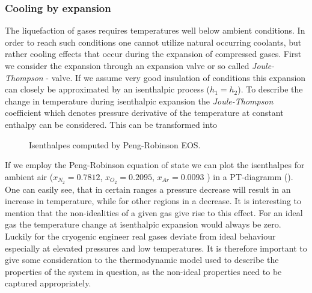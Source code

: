     \subsubsection{Cooling by expansion}
        The liquefaction of gases requires temperatures well below ambient conditions. In order to reach
        such conditions one cannot utilize natural occurring coolants, but rather cooling effects that occur
        during the expansion of compressed gases. First we consider the expansion through an expansion valve
        or so called \emph{Joule-Thompson} - valve. If we assume very good insulation of  conditions this
        expansion can closely be approximated by an isenthalpic process ($h_1 = h_2$). To describe the change
        in temperature during isenthalpic expansion the \emph{Joule-Thompson} coefficient
        which denotes pressure derivative of the temperature at constant enthalpy can be considered.
        This can be transformed into


        \begin{figure}
            \center
            
            \caption{Isenthalpes computed by Peng-Robinson EOS.}
            \label{fig:pr_isenthalpes}
        \end{figure}

        If we employ the Peng-Robinson equation of state we can plot the isenthalpes for ambient air
        ($x_{N_2}=0.7812$, $x_{O_2}=0.2095$, $x_{Ar}=0.0093$ ) in a PT-diagramm ().
        One can easily see, that in certain ranges a pressure decrease will result in an increase in temperature,
        while for other regions in a decrease. It is interesting to mention that the non-idealities
        of a given gas give rise to this effect. For an ideal gas the temperature change at isenthalpic
        expansion would always be zero. Luckily for the cryogenic engineer real gases deviate from ideal
        behaviour especially at elevated pressures and low temperatures. It is therefore important to give some
        consideration to the thermodynamic model used to describe the properties of the system in question, as the
        non-ideal properties need to be captured appropriately.

